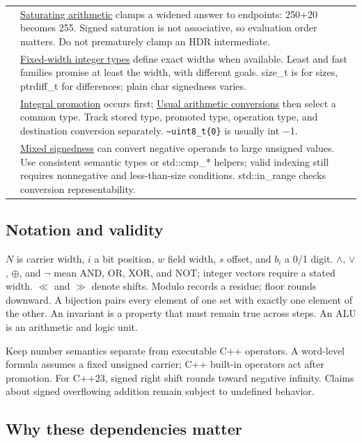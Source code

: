 {\begin{longtable}[]{@{}
  >{\raggedright\arraybackslash}p{}
  >{\raggedright\arraybackslash}p{}@{}}
37 & \hyperref[appendix-3999c6209649]{Saturating arithmetic} clamps a widened answer to endpoints: 250+20 becomes 255. Signed saturation is not associative, so evaluation order matters. Do not prematurely clamp an HDR intermediate. \\
38 & \hyperref[appendix-cc04044b5782]{Fixed-width integer types} define exact widths when available. Least and fast families promise at least the width, with different goals. size\_t is for sizes, ptrdiff\_t for differences; plain char signedness varies. \\
39 & \hyperref[appendix-45303d03796a]{Integral promotion} occurs first; \hyperref[appendix-5e2d663adf7f]{Usual arithmetic conversions} then select a common type. Track stored type, promoted type, operation type, and destination conversion separately. \texttt{\textasciitilde{}uint8\_t\{0\}} is usually int −1. \\
40 & \hyperref[appendix-736a2345de4a]{Mixed signedness} can convert negative operands to large unsigned values. Use consistent semantic types or std::cmp\_* helpers; valid indexing still requires nonnegative and less-than-size conditions. std::in\_range checks conversion representability. \\
\end{longtable}
}

\subsection{Notation and validity}\label{notation-and-validity}

\(N\) is carrier width, \(i\) a bit position, \(w\) field width, \(s\) offset, and \(b_i\) a 0/1 digit. \(\land\), \(\lor\), \(\oplus\), and \(\neg\) mean AND, OR, XOR, and NOT; integer vectors require a stated width. \(\ll\) and \(\gg\) denote shifts. Modulo records a residue; floor rounds downward. A bijection pairs every element of one set with exactly one element of the other. An invariant is a property that must remain true across steps. An ALU is an arithmetic and logic unit.

Keep number semantics separate from executable C++ operators. A word-level formula assumes a fixed unsigned carrier; C++ built-in operators act after promotion. For C++23, signed right shift rounds toward negative infinity. Claims about signed overflowing addition remain subject to undefined behavior.

\subsection{Why these dependencies matter}\label{why-these-dependencies-matter}

